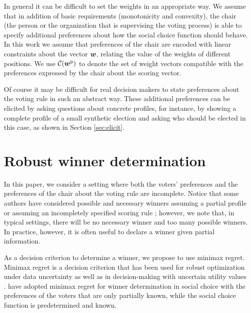 In general it can be difficult to set the weights in an appropriate way.
We assume that in addition of basic requirements (monotonicity and convexity), the chair (the person or the organization that is supervising the voting process) is able to specify additional preferences about how the social choice function should behave.
In this work we assume that preferences of the chair are encoded with linear constraints about the vector $\bm{w}$, relating the value of the weights of different positions.
We use $\mathcal{C}(\bm{w}^\text{p})$ to denote the set of weight vectors compatible with the preferences expressed by the chair about the scoring vector. 

Of course it may be difficult for real decision makers to state preferences about the voting rule in such an abstract way.
These additional preferences can be elicited by asking questions about concrete profiles, for instance, by showing a complete profile of a small synthetic election and asking who should be elected in this case, as shown in Section \ref{sec:elicit}.

\section[Minimax regret under partial profile and weight information]{
Robust winner determination}
\label{sec:mmr}

In this paper, we consider a setting where both the voters' preferences and the preferences of the chair about the voting rule are incomplete.
Notice that some authors have considered possible and necessary winners assuming a partial profile  \citep{Xia2008} or assuming an incompletely specified scoring rule \citep{Viappiani2018};
however, we note that, in typical settings, there will be no necessary winner and too many possible winners.
In practice, however, it is often useful to declare a winner given partial information.

As a decision criterion to determine a winner, we propose to use minimax regret. 
Minimax regret \citep{Savage1954} is a decision criterion that has been used for robust optimization under data uncertainty \citep{Kouvelis1997} as well as in decision-making with uncertain utility values \citep{Salo2001,Boutilier2006}.
\citet{Lu2011} have adopted minimax regret for winner determination in social choice with
the preferences of the voters that are only partially known, while the social choice function is predetermined and known.

